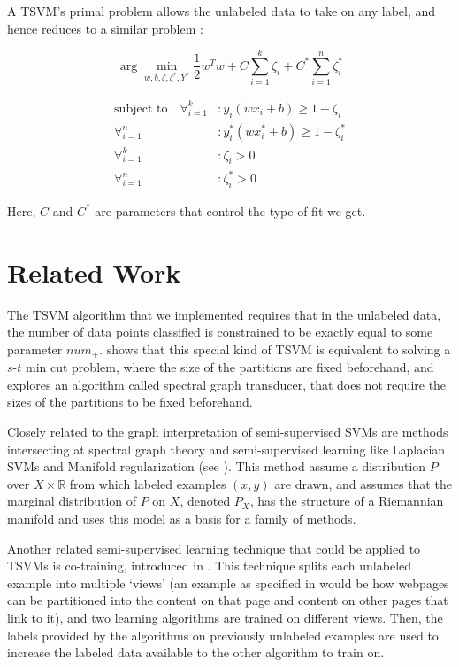 \documentclass[11pt]{article}
\begin{document}
A TSVM's primal problem allows the unlabeled data to take on any label, and hence reduces to a similar problem \cite{Joachims:1999}:

\begin{equation}\label{eq:2}
\arg\min_{w, b, \zeta, \zeta^*, Y^*} \frac{1}{2}w^Tw+C\sum_{i=1}^k\zeta_i+C^*\sum_{i=1}^n\zeta^*_i
\end{equation}

\begin{align*}
\textrm{subject to}\quad \forall_{i=1}^k&: y_i(wx_i+b)\geq 1-\zeta_i \\
\forall_{i=1}^n&: y^*_i(wx^*_i+b)\geq 1-\zeta^*_i \\
\forall_{i=1}^k&: \zeta_i>0 \\
\forall_{i=1}^n&: \zeta^*_i>0
\end{align*}

Here, $C$ and $C^*$ are parameters that control the type of fit we get.

\section{Related Work}

The TSVM algorithm that we implemented requires that in the unlabeled
data, the number of data points classified is constrained to be
exactly equal to some parameter $num_+$. \cite{joachims2003transductive}
shows that this special kind of TSVM is equivalent to solving
a $s$-$t$ min cut problem, where the size of the partitions are fixed beforehand, and explores an algorithm called spectral graph transducer,
that does not require the sizes of the partitions to be fixed beforehand.

Closely related to the graph interpretation of semi-supervised SVMs
are methods intersecting at spectral graph theory and semi-supervised
learning like Laplacian SVMs and Manifold regularization
(see \cite{belkin2005manifold}). This method assume a distribution $P$
over $X\times \mathbb{R}$ from which labeled examples $(x,y)$ are drawn,
and assumes that the marginal distribution of $P$ on $X$, denoted $P_X$,
has the structure of a Riemannian manifold and uses this model
as a basis for a family of methods.

Another related semi-supervised learning technique that could
be applied to TSVMs is co-training, introduced in
\cite{blum1998combining}. This technique splits each unlabeled
example into multiple `views' (an example as specified in \cite{blum1998combining} would be how webpages can be partitioned into
the content on that page and content on other pages that link to it),
and two learning algorithms are trained on different views. Then,
the labels provided by the algorithms on previously unlabeled examples
are used to increase the labeled data available to the other
algorithm to train on.
\end{document}
